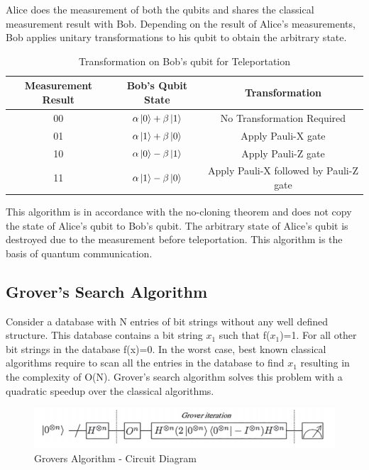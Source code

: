 \documentclass[english,a4paper,11pt,oneside,onecolumn]{book}
\begin{document}
\noindent Alice does the measurement of both the qubits and shares the classical measurement result with Bob. Depending on the result of Alice's measurements, Bob applies unitary transformations to his qubit to obtain the arbitrary state.

\begin{table}[!h]
\begin{center}
\begin{tabular}{|c|c|c|}
\hline
\textbf{Measurement Result} & \textbf{Bob's Qubit State} & \textbf{Transformation} \\
\hline
00 & \(\alpha\ket{0}+\beta\ket{1}\) & No Transformation Required\\
\hline
01 & \(\alpha\ket{1}+\beta\ket{0}\) & Apply Pauli-X gate \\
\hline
10 & \(\alpha\ket{0}-\beta\ket{1}\) & Apply Pauli-Z gate \\
\hline
11 & \(\alpha\ket{1}-\beta\ket{0}\) & Apply Pauli-X followed by Pauli-Z gate\\
\hline
\end{tabular}
\end{center}
\caption{Transformation on Bob's qubit for Teleportation} 
\label{tab:qTelePort}
\end{table}

\noindent This algorithm is in accordance with the no-cloning theorem and does not copy the state of Alice's qubit to Bob's qubit. The arbitrary state of Alice's qubit is destroyed due to the measurement before teleportation. This algorithm is the basis of quantum communication.

\subsection{Grover's Search Algorithm}
\label{sec:groverAlgo}
Consider a database with N entries of bit strings without any well defined structure. This database contains a bit string \(x_1\) such that f(\(x_1\))=1. For all other bit strings in the database f(x)=0. In the worst case, best known classical algorithms require to scan all the entries in the database to find \(x_1\) resulting in the complexity of O(N). Grover's search algorithm solves this problem with a quadratic speedup over the classical algorithms.\\

\begin{figure}[H]
    \centering
    \includegraphics[scale=0.7]{Images/GroversCircuit.png}
    \caption{Grovers Algorithm - Circuit Diagram}
    \label{fig:groverCircuit}
\end{figure}
\end{document}
